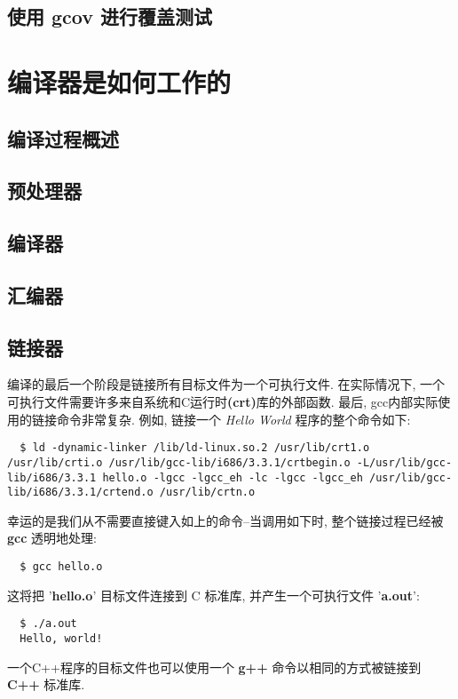 \documentclass[lang=cn,10pt,newtx,scheme=chinese]{elegantbook}
\begin{document}
\section{使用 gcov 进行覆盖测试}

\chapter{编译器是如何工作的}
\section{编译过程概述}
\section{预处理器}
\section{编译器}
\section{汇编器}
\section{链接器}
编译的最后一个阶段是链接所有目标文件为一个可执行文件. 在实际情况下, 一个可执行文件需要许多来自系统和C运行时\textbf{(crt)}库的外部函数. 最后, gcc内部实际使用的链接命令非常复杂. 例如, 链接一个 \textit{Hello World} 程序的整个命令如下:
\begin{lstlisting}
  $ ld -dynamic-linker /lib/ld-linux.so.2 /usr/lib/crt1.o /usr/lib/crti.o /usr/lib/gcc-lib/i686/3.3.1/crtbegin.o -L/usr/lib/gcc-lib/i686/3.3.1 hello.o -lgcc -lgcc_eh -lc -lgcc -lgcc_eh /usr/lib/gcc-lib/i686/3.3.1/crtend.o /usr/lib/crtn.o
\end{lstlisting}

  幸运的是我们从不需要直接键入如上的命令--当调用如下时, 整个链接过程已经被 \textbf{gcc} 透明地处理: 

\begin{lstlisting}
  $ gcc hello.o
\end{lstlisting}

  这将把 '\textbf{hello.o}' 目标文件连接到 C 标准库, 并产生一个可执行文件 '\textbf{a.out}':

\begin{lstlisting}
  $ ./a.out
  Hello, world!
\end{lstlisting}

  一个C++程序的目标文件也可以使用一个 \textbf{g++} 命令以相同的方式被链接到 \textbf{C++} 标准库.
\end{document}
